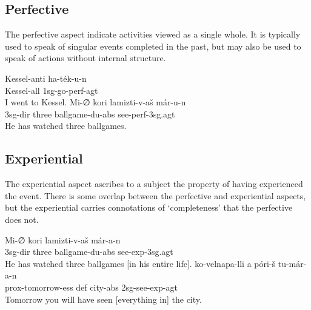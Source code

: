 \documentclass[grammar]{subfiles}
\begin{document}
\subsection{Perfective}
\label{vp:ssec_perfective}

The perfective aspect indicate activities viewed as a single whole.  It is
typically used to speak of singular events completed in the past, but may also
be used to speak of actions without internal structure.

\begin{exe}
  \ex {}
  \gll Kessel-anti ha-ték-u-n\\
  Kessel-\acs{all} \acs{1sg}-go-\acs{perf}-\acs{agt}\\
  \glt I went to Kessel.
  \ex {}
  \gll Mi-∅ kori lamizti-v-aš már-u-n\\ 
  \acs{3sg}-\acs{dir} three ballgame-\acs{du}-\acs{abs} see-\acs{perf}-\acs{3sg}.\acs{agt}\\
  \glt He has watched three ballgames.
\end{exe}



\subsection{Experiential}
\label{vp:ssec_experiential}

The experiential aspect ascribes to a subject the property of having
experienced the event.  There is some overlap between the perfective and
experiential aspects, but the experiential carries connotations of
‘completeness’ that the perfective does not.   

\begin{exe}
  \ex {}
  \gll Mi-∅ kori lamizti-v-aš már-a-n\\ 
  \acs{3sg}-\acs{dir} three ballgame-\acs{du}-\acs{abs} see-\acs{exp}-\acs{3sg}.\acs{agt}\\
  \glt He has watched three ballgames [in his entire life].
  \ex {}
  \gll ko-velnapa-lli a póri-š tu-már-a-n\\
  \acs{prox}-tomorrow-\acs{ess} \acs{def} city-\acs{abs} \acs{2sg}-see-\acs{exp}-\acs{agt}\\
  \glt Tomorrow you will have seen [everything in] the city.
\end{exe}
\end{document}
